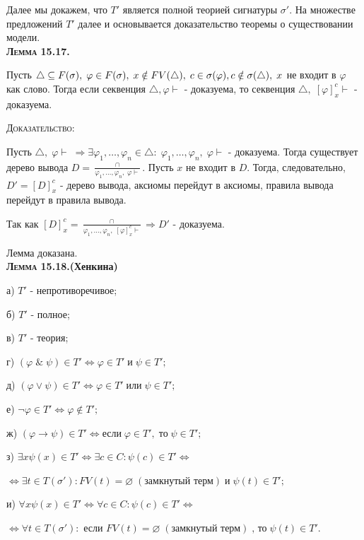 \documentclass[18pt, a4paper]{extarticle}
\newcommand{\ampersand}{\;\&\;}
\newcommand{\vp}{\varphi}
\newcommand{\vd}{\vdash}
\newcommand{\dok}{\textsc{Доказательство:}}
\begin{document}
Далее мы докажем, что $T'$ является полной теорией сигнатуры $\sigma'$. На множестве
предложений $T'$ далее и основывается доказательство теоремы о существовании
модели.\\

\textbf{\textsc{Лемма 15.17.}} 

Пусть $\triangle\subseteq F(\sigma),\;\vp\in F(\sigma),\;x\notin FV(\triangle),\;c\in\sigma(\vp),\\c\notin\sigma(\triangle),\;x$ не входит в $\vp$ как слово. Тогда если секвенция $\triangle,\vp\vd$ -  доказуема, то секвенция $\triangle,\;[\vp]_x^c\vd$ -  доказуема.

\dok

Пусть $\triangle,\;\vp\vd\;\Rightarrow\exists\vp_1,\dots,\vp_n\in\triangle:\;\vp_1,\dots,\vp_n,\;\vp\vd$ -  доказуема. Тогда существует дерево вывода $D=\displaystyle \frac{\cap}{\vp_1,\dots,\vp_n,\;\vp\vd}$. Пусть $x$ не входит в $D$. Тогда, следовательно, $D'=[D]_x^c$ -  дерево вывода, аксиомы перейдут в аксиомы, правила вывода перейдут в правила вывода. 

Так как $[D]_x^c=\displaystyle \frac{\cap}{\vp_1,\dots,\vp_n,\;[\vp]_x^c\vd}\Rightarrow D'$ - доказуема.

Лемма доказана.\\

\textbf{\textsc{Лемма 15.18.}(Хенкина)}

а) $T'$ -  непротиворечивое;

б) $T'$ -  полное;

в) $T'$ -  теория;

г) $(\vp\ampersand\psi)\in T'\Leftrightarrow\vp\in T'\;\text{и}\;\psi\in T';$

д) $(\vp\vee\psi)\in T'\Leftrightarrow\vp\in T'\;\text{или}\;\psi\in T';$

е) $\lnot\vp\in T'\Leftrightarrow\vp\notin T';$

ж) $(\vp\to\psi)\in T'\Leftrightarrow\text{если}\;\vp\in T',\;\text{то}\;\psi\in T';$

з) $\exists x\psi(x)\in T'\Leftrightarrow\exists c\in C:\psi(c)\in T'\Leftrightarrow$

\qquad\qquad$\Leftrightarrow\exists t\in T(\sigma'):FV(t)=\varnothing\;(\text{замкнутый терм})\;\text{и}\;\psi(t)\in T';$

и) $\forall x\psi(x)\in T'\Leftrightarrow\forall c\in C:\psi(c)\in T'\Leftrightarrow$

\qquad\qquad$\Leftrightarrow\forall t\in T(\sigma'):$ если $FV(t)=\varnothing\;(\text{замкнутый терм})\;\text{, то}\;\psi(t)\in T'$.
\end{document}
